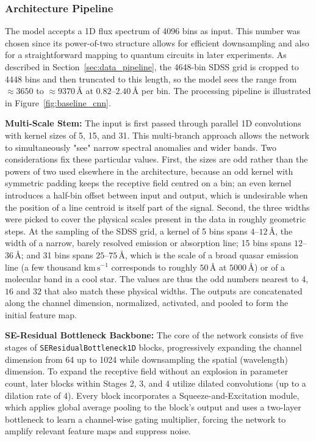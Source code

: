 \subsubsection{Architecture Pipeline}
\label{sec:baseline_arch}

The model accepts a 1D flux spectrum of 4096 bins as input. This number was chosen since
its power-of-two structure allows for efficient downsampling and also for a straightforward
mapping to quantum circuits in later experiments. As described in
Section~\ref{sec:data_pipeline}, the 4648-bin SDSS grid is cropped to 4448 bins and then
truncated to this length, so the model sees the range from $\approx 3650$ to
$\approx 9370$\,\AA{} at $0.82$--$2.40$\,\AA{} per bin.
The processing pipeline is illustrated in Figure~\ref{fig:baseline_cnn}.

\textbf{Multi-Scale Stem:} The input is first passed through parallel 1D convolutions with
kernel sizes of 5, 15, and 31. This multi-branch approach allows the network to
simultaneously "see" narrow spectral anomalies and wider bands. Two considerations fix
these particular values. First, the sizes are odd rather than the powers of two used
elsewhere in the architecture, because an odd kernel with symmetric padding keeps the
receptive field centred on a bin; an even kernel introduces a half-bin offset between input
and output, which is undesirable when the position of a line centroid is itself part of the
signal. Second, the three widths were picked to cover the physical scales present in the
data in roughly geometric steps. At the sampling of the SDSS grid, a kernel of 5 bins spans
$4$--$12$\,\AA, the width of a narrow, barely resolved emission or absorption line; 15 bins
spans $12$--$36$\,\AA; and 31 bins spans $25$--$75$\,\AA, which is the scale of a broad
quasar emission line (a few thousand $\mathrm{km\,s^{-1}}$ corresponds to roughly
$50$\,\AA{} at $5000$\,\AA) or of a molecular band in a cool star. The values are thus the
odd numbers nearest to $4$, $16$ and $32$ that also match these physical widths. The
outputs are concatenated along the channel dimension, normalized, activated, and pooled to
form the initial feature map.

\textbf{SE-Residual Bottleneck Backbone:} The core of the network consists of five stages of \texttt{SEResidualBottleneck1D} blocks, progressively expanding the channel dimension from 64 up to 1024 while downsampling the spatial (wavelength) dimension. To expand the receptive field without an explosion in parameter count, later blocks within Stages 2, 3, and 4 utilize dilated convolutions (up to a dilation rate of 4). Every block incorporates a Squeeze-and-Excitation module, which applies global average pooling to the block's output and uses a two-layer bottleneck to learn a channel-wise gating multiplier, forcing the network to amplify relevant feature maps and suppress noise.


